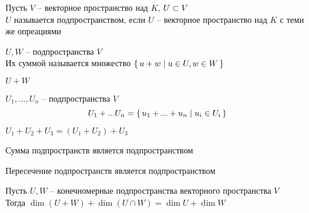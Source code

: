 \begin{definition}
	Пусть $V$ -- векторное пространство над $K$, $U \subset V $ \\
    $U$ называется подпространством, если $U$ -- векторное пространство над $K$ с теми же опреациями
\end{definition}

\begin{definition}
	$ U, W $ -- подпространства $V$ \\
    Их суммой называется множество $ \set{u + w | u \in U, w \in W} $
\end{definition}

\begin{notation}
	$ U + W $
\end{notation}

\begin{definition}
	$ U_1, ..., U_n $ -- подпространства $V$
    $$ U_1 + ... U_n = \set{u_1 + ... + u_n | u_i \in U_i} $$
\end{definition}

\begin{remark}
	$ U_1 + U_2 + U_3 = (U_1 + U_2) + U_3 $
\end{remark}

\begin{props}
	\item Сумма подпространств является подпространством
    \item Пересечение подпространств является подпространством
\end{props}

\begin{theorem}
	Пусть $ U, W $ -- конечномерные подпространства векторного пространства $V$ \\
    Тогда $ \dim (U + W) + \dim (U \cap W) = \dim U + \dim W $
\end{theorem}

